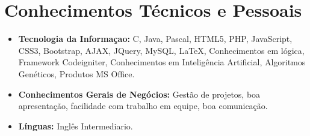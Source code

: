 \documentclass[10pt,a4paper,sans]{moderncv}        %
\begin{document}
\vspace{2pt}

\section{Conhecimentos Técnicos e Pessoais}

\vspace{6pt}

\begin{itemize}

\item \textbf{Tecnologia da Informaçao:} C, Java, Pascal, HTML5, PHP, JavaScript, CSS3, Bootstrap, AJAX, JQuery, MySQL, LaTeX, Conhecimentos em lógica, Framework Codeigniter, Conhecimentos em Inteligência Artificial, Algoritmos Genéticos, Produtos MS Office.

\vspace{6pt}







\item \textbf{Conhecimentos Gerais de Negócios:} Gestão de projetos, boa apresentação, facilidade com trabalho em equipe, boa comunicação.

\vspace{6pt}

\item \textbf{Línguas:} Inglês Intermediario.



\end{itemize}
\end{document}
